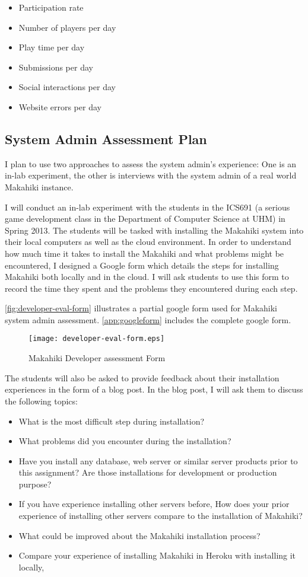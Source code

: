 \begin{itemize}
\item Participation rate
\item Number of players per day
\item Play time per day
\item Submissions per day
\item Social interactions per day
\item Website errors per day
\end{itemize}

\subsection{System Admin Assessment Plan}

I plan to use two approaches to assess the system admin's experience: One is an in-lab experiment, the other is interviews with the system admin of a real world Makahiki instance.

I will conduct an in-lab experiment with the students in the ICS691 (a serious game development class in the Department of Computer Science at UHM) in Spring 2013.  The students will be tasked with installing the Makahiki system into their local computers as well as the cloud environment. In order to understand how much time it takes to install the Makahiki and what problems might be encountered, I designed a Google form which details the steps for installing Makahiki both locally and in the cloud. I will ask students to use this form to record the time they spent and the problems they encountered during each step.

\autoref{fig:developer-eval-form} illustrates a partial google form used for Makahiki system admin assessment. \autoref{app:googleform} includes the complete google form.
\begin{figure}[ht!]
   \centering
   \texttt{[image: developer-eval-form.eps]}
   \caption{Makahiki Developer assessment Form}
   \label{fig:developer-eval-form}
\end{figure}

The students will also be asked to provide feedback about their installation experiences in the form of a blog post. In the blog post, I will ask them to discuss the following topics:
\begin{itemize}
\item What is the most difficult step during installation?
\item What problems did you encounter during the installation?
\item Have you install any database, web server or similar server products prior to this assignment? Are those installations for development or production purpose?
\item If you have experience installing other servers before, How does your prior experience of installing other servers compare to the installation of Makahiki?
\item What could be improved about the Makahiki installation process?
\item Compare your experience of installing Makahiki in Heroku with installing it locally,
\end{itemize}

